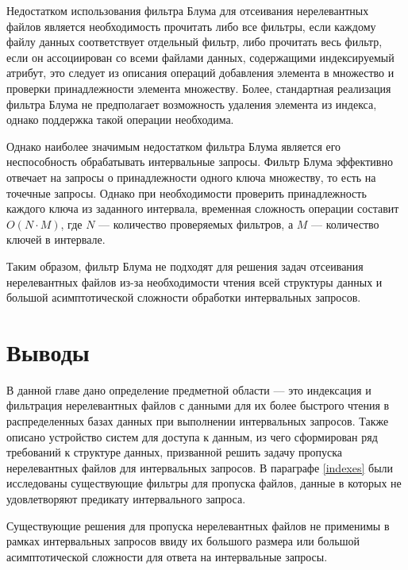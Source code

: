 Недостатком использования фильтра Блума для отсеивания нерелевантных файлов является необходимость прочитать либо все фильтры, если каждому файлу данных соответствует отдельный фильтр, либо прочитать весь фильтр, если он ассоциирован со всеми файлами данных, содержащими индексируемый атрибут, это следует из описания операций добавления элемента в множество и проверки принадлежности элемента множеству. Более, стандартная реализация фильтра Блума не предполагает возможность удаления элемента из индекса, однако поддержка такой операции необходима.

Однако наиболее значимым недостатком фильтра Блума является его неспособность обрабатывать интервальные запросы. Фильтр Блума эффективно отвечает на запросы о принадлежности одного ключа множеству, то есть на точечные запросы. Однако при необходимости проверить принадлежность каждого ключа из заданного интервала, временная сложность операции составит $O(N \cdot M)$, где $N$ --- количество проверяемых фильтров, а $M$ --- количество ключей в интервале. 

Таким образом, фильтр Блума не подходят для решения задач отсеивания нерелевантных файлов из-за необходимости чтения всей структуры данных и большой асимптотической сложности обработки интервальных запросов.


\newpage
\section*{Выводы}

В данной главе дано определение предметной области --- это индексация и фильтрация нерелевантных файлов с данными для их более быстрого чтения в распределенных базах данных при выполнении интервальных запросов. Также описано устройство систем для доступа к данным, из чего сформирован ряд требований к структуре данных, призванной решить задачу пропуска нерелевантных файлов для интервальных запросов. В параграфе \ref{indexes} были исследованы существующие фильтры для пропуска файлов, данные в которых не удовлетворяют предикату интервального запроса.

Существующие решения для пропуска нерелевантных файлов не применимы в рамках интервальных запросов ввиду их большого размера или большой асимптотической сложности для ответа на интервальные запросы.
